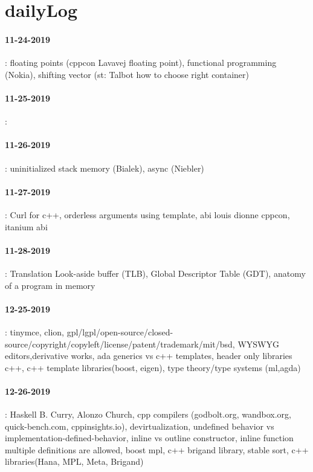 \section{dailyLog}
\paragraph{11-24-2019}: floating points (cppcon Lavavej floating point), functional programming (Nokia), shifting vector (st: Talbot how to choose right container)
\paragraph{11-25-2019}:
\paragraph{11-26-2019}: uninitialized stack memory (Bialek), async (Niebler) 
\paragraph{11-27-2019}: Curl for c++, orderless arguments using template, abi louis dionne cppcon, itanium abi
\paragraph{11-28-2019}: Translation Look-aside buffer (TLB), Global Descriptor Table (GDT), anatomy of a program in memory 
\paragraph{12-25-2019}: tinymce, clion, gpl/lgpl/open-source/closed-source/copyright/copyleft/license/patent/trademark/mit/bsd, WYSWYG editors,derivative works, ada generics vs c++ templates, header only libraries c++, c++ template libraries(boost, eigen), type theory/type systems
(ml,agda)
\paragraph{12-26-2019}: Haskell B. Curry, Alonzo Church, cpp compilers (godbolt.org, wandbox.org, quick-bench.com, cppinsights.io), devirtualization,
undefined behavior vs implementation-defined-behavior, inline vs outline constructor, inline function multiple definitions are allowed, 
boost mpl, c++ brigand library, stable sort, c++ libraries(Hana, MPL, Meta, Brigand)
